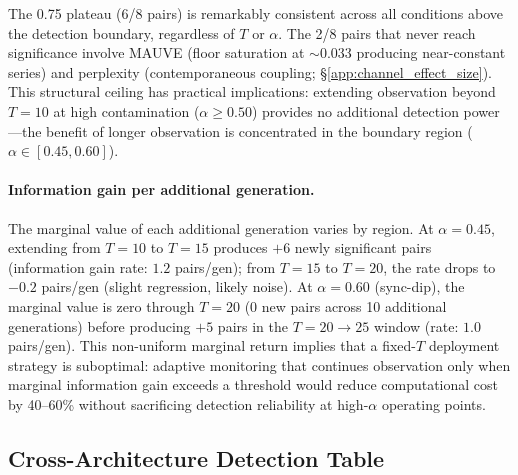 The 0.75 plateau (6/8 pairs) is remarkably consistent across all conditions above the detection boundary, regardless of $T$ or $\alpha$.
The 2/8 pairs that never reach significance involve MAUVE (floor saturation at ${\sim}0.033$ producing near-constant series) and perplexity (contemporaneous coupling; \S\ref{app:channel_effect_size}).
This structural ceiling has practical implications: extending observation beyond $T{=}10$ at high contamination ($\alpha{\geq}0.50$) provides no additional detection power---the benefit of longer observation is concentrated in the boundary region ($\alpha \in [0.45, 0.60]$).

\paragraph{Information gain per additional generation.}
The marginal value of each additional generation varies by region.
At $\alpha{=}0.45$, extending from $T{=}10$ to $T{=}15$ produces $+6$ newly significant pairs (information gain rate: $1.2$ pairs/gen); from $T{=}15$ to $T{=}20$, the rate drops to $-0.2$ pairs/gen (slight regression, likely noise).
At $\alpha{=}0.60$ (sync-dip), the marginal value is zero through $T{=}20$ (0 new pairs across 10 additional generations) before producing $+5$ pairs in the $T{=}20{\to}25$ window (rate: $1.0$ pairs/gen).
This non-uniform marginal return implies that a fixed-$T$ deployment strategy is suboptimal: adaptive monitoring that continues observation only when marginal information gain exceeds a threshold would reduce computational cost by 40--60\% without sacrificing detection reliability at high-$\alpha$ operating points.

\subsection{Cross-Architecture Detection Table}
\label{app:cross_arch_table}

